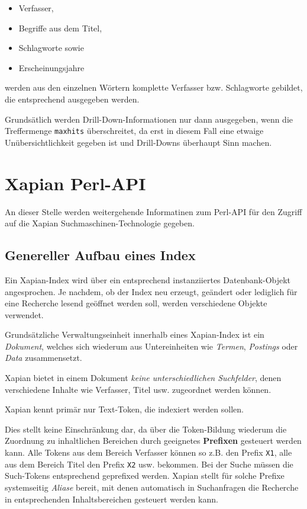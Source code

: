 \documentclass[11pt, twoside, a4paper, BCOR8mm, DIV12, bibtotoc,idxtotoc]{scrbook}
\begin{document}
\begin{itemize}
\item Verfasser,
\item Begriffe aus dem Titel,
\item Schlagworte sowie
\item Erscheinungsjahre
\end{itemize}

werden aus den einzelnen Wörtern komplette Verfasser bzw. Schlagworte
gebildet, die entsprechend ausgegeben werden.

Grundsätlich werden Drill-Down-Informationen nur dann ausgegeben, wenn
die Treffermenge \texttt{maxhits} überschreitet, da erst in diesem
Fall eine etwaige Unübersichtlichkeit gegeben ist und Drill-Downs
überhaupt Sinn machen.



\appendix


\chapter{Xapian Perl-API}

An dieser Stelle werden weitergehende Informatinen zum Perl-API für
den Zugriff auf die Xapian Suchmaschinen-Technologie gegeben.


\section{Genereller Aufbau eines Index}
Ein Xapian-Index wird über ein entsprechend instanziiertes
Datenbank-Objekt angesprochen. Je nachdem, ob der Index neu erzeugt,
geändert oder lediglich für eine Recherche lesend geöffnet werden
soll, werden verschiedene Objekte verwendet.

Grundsätzliche Verwaltungseinheit innerhalb eines Xapian-Index ist ein
\emph{Dokument}, welches sich wiederum aus Untereinheiten wie \emph{Termen},
\emph{Postings} oder \emph{Data} zusammensetzt.

Xapian bietet in einem Dokument \emph{keine unterschiedlichen
  Suchfelder}, denen verschiedene Inhalte wie Verfasser, Titel
usw. zugeordnet werden können. 

Xapian kennt primär nur Text-Token, die indexiert werden sollen.

Dies stellt keine Einschränkung dar, da über die Token-Bildung
wiederum die Zuordnung zu inhaltlichen Bereichen durch geeignetes
\textbf{Prefixen} gesteuert werden kann. Alle Tokens aus dem Bereich
Verfasser können so z.B. den Prefix \texttt{X1}, alle aus dem Bereich
Titel den Prefix \texttt{X2} usw. bekommen. Bei der Suche müssen die
Such-Tokens entsprechend geprefixed werden. Xapian stellt für solche
Prefixe systemseitig \emph{Aliase} bereit, mit denen automatisch in
Suchanfragen die Recherche in entsprechenden Inhaltsbereichen gesteuert
werden kann.
 
\end{document}
